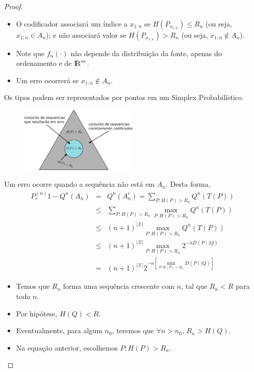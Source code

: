 \begin{frame}[allowframebreaks]
\begin{proof}
  \begin{itemize}
  \item O codificador associará um índice a $x_{1:n}$ se $H(P_{x_{1:n}}) \leq  R_n$ (ou seja, $x_{1:n} \in A_n$); 
  e não associará valor se $H(P_{x_{1:n}}) >  R_n$ (ou seja, $x_{1:n} \notin A_n$).
  \item Note que $f_n(\cdot)$ não depende da distribuição da fonte, apenas do ordenamento e de ${\rm I\!R}^m$.
  \item Um erro ocorrerá se $x_{1:n} \notin A_n$.
  \end{itemize}
  
  \proofbreak
  Os tipos podem ser representados por pontos em um Simplex Probabilístico.
    \begin{figure}[h!]
    \centering
    \includegraphics[width=0.5\textwidth]{images/type-simplex.pdf}
    \label{fig:type-simplex}
    \end{figure}

  \proofbreak

  Um erro ocorre quando a sequência não está em $A_n$. Desta forma,
  \begin{eqnarray}
  P_e^{(n)} 1 - Q^n(A_n) &=& Q^n(A^c_n) = \sum_{P: H(P) > R_n} Q^n (T(P)) \nonumber \\
	&\leq& \sum_{P: H(P) > R_n} \max_{P: H(P) > R_n} Q^n (T(P)) \nonumber \\
	&\leq& (n+1)^{\vert \mathcal{X} \vert} \max_{P: H(P) > R_n} Q^n (T(P)) \nonumber \\
	&\leq& (n+1)^{\vert \mathcal{X} \vert} \max_{P: H(P) > R_n} 2^{-n  D(P \mid\mid Q)} \nonumber \\
	&=& (n+1)^{\vert \mathcal{X} \vert} 2^{-n [\min_{P: H(P) > R_n} D(P \mid\mid Q)]}
  \end{eqnarray}


  \proofbreak

  \begin{itemize}
  \item Temos que $R_n$ forma uma sequência crescente com $n$, tal que $R_n < R$ para todo $n$.
  \item Por hipótese, $H(Q) < R$.
  \item Eventualmente, para algum $n_0$, teremos que $\forall n > n_0$, $R_n > H(Q)$.
  \item Na equação anterior, escolhemos $P: H(P) > R_n$.


\end{itemize}
\end{proof}
\end{frame}
